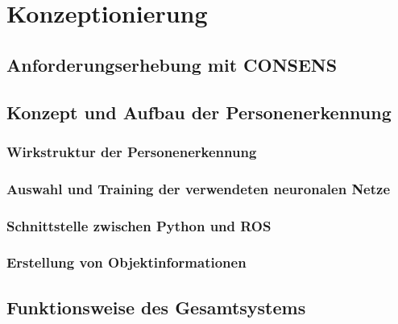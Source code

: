 \chapter{Konzeptionierung}
\label{ch: Konzeptionierung}

	
	
	\section{Anforderungserhebung mit CONSENS}
	\label{sec: Anforderungserhebung}
			
	
	\section{Konzept und Aufbau der Personenerkennung}
	
		\subsection{Wirkstruktur der Personenerkennung}
		
		\subsection{Auswahl und Training der verwendeten neuronalen Netze}
		
		\subsection{Schnittstelle zwischen Python und ROS}
		
		\subsection{Erstellung von Objektinformationen}
	
	\section{Funktionsweise des Gesamtsystems}
	
	
		
		
				   		

